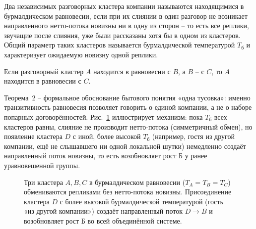 \documentclass[11pt,a4paper]{article}
\newcommand{\Burm}{\text{Б}}
\newcommand{\Tb}{T_{\text{б}}}
\begin{document}
\begin{definition}
Два независимых разговорных кластера компании называются находящимися в бурмалдическом равновесии, если при их слиянии в один разговор не возникает направленного нетто-потока новизны ни в одну из сторон -- то есть все реплики, звучащие после слияния, уже были рассказаны хотя бы в одном из кластеров. Общий параметр таких кластеров называется бурмалдической температурой $\Tb$ и характеризует ожидаемую новизну одной реплики.
\end{definition}

\begin{theorem}
Если разговорный кластер $A$ находится в равновесии с $B$, а $B$ -- с $C$, то $A$ находится в равновесии с $C$.
\end{theorem}

Теорема~2 -- формальное обоснование бытового понятия «одна тусовка»: именно транзитивность равновесия позволяет говорить о единой компании, а не о наборе попарных договорённостей. Рис.~\ref{fig:equilibrium} иллюстрирует механизм: пока $\Tb$ всех кластеров равны, слияние не производит нетто-потока (симметричный обмен), но появление кластера $D$ с иной, более высокой $\Tb$ (например, гостя из другой компании, ещё не слышавшего ни одной локальной шутки) немедленно создаёт направленный поток новизны, то есть возобновляет рост $\Burm$ у ранее уравновешенной группы.

\begin{figure}[htbp]
\centering
{}
\caption{Три кластера $A,B,C$ в бурмалдическом равновесии ($T_A=T_B=T_C$) обмениваются репликами без нетто-потока новизны. Присоединение кластера $D$ с более высокой бурмалдической температурой (гость «из другой компании») создаёт направленный поток $D\to B$ и возобновляет рост $\Burm$ во всей объединённой системе.}
\label{fig:equilibrium}
\end{figure}
\end{document}

